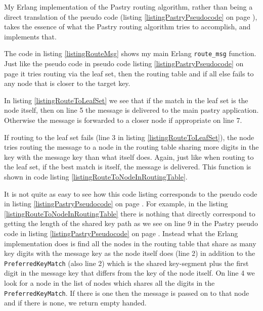 \mbox{}

My Erlang implementation of the Pastry routing algorithm, rather than being a direct translation of the pseudo code (listing \ref{listingPastryPseudocode} on page \pageref{listingPastryPseudocode}), takes the essence of what the Pastry routing algorithm tries to accomplish, and implements that.

The code in listing \ref{listingRouteMsg} shows my main Erlang \verb=route_msg= function. 
Just like the pseudo code in pseudo code listing \ref{listingPastryPseudocode} on page \pageref{listingPastryPseudocode} it tries routing via the leaf set, then the routing table and if all else fails to any node that is closer to the target key.



In listing \ref{listingRouteToLeafSet} we see that if the match in the leaf set is the node itself, then on line 5 the message is delivered to the main pastry application. Otherwise the message is forwarded to a closer node if appropriate on line 7.



If routing to the leaf set fails (line 3 in listing \ref{listingRouteToLeafSet}), the node tries routing the message to a node in the routing table sharing more digits in the key with the message key than what itself does. Again, just like when routing to the leaf set, if the best match is itself, the message is delivered. This function is shown in code listing \ref{listingRouteToNodeInRoutingTable}.

It is not quite as easy to see how this code listing corresponds to the pseudo code in listing \ref{listingPastryPseudocode} on page \pageref{listingPastryPseudocode}. For example, in the listing \ref{listingRouteToNodeInRoutingTable} there is nothing that directly correspond to getting the length of the shared key path as we see on line 9 in the Pastry pseudo code in listing \ref{listingPastryPseudocode} on page \pageref{listingPastryPseudocode}. Instead what the Erlang implementation does is find all the nodes in the routing table that share as many key digits with the message key as the node itself does (line 2) in addition to the \verb=PreferredKeyMatch= (also line 2) which is the shared key-segment plus the first digit in the message key that differs from the key of the node itself.
On line 4 we look for a node in the list of nodes which shares all the digits in the \verb=PreferredKeyMatch=. If there is one then the message is passed on to that node and if there is none, we return empty handed.

